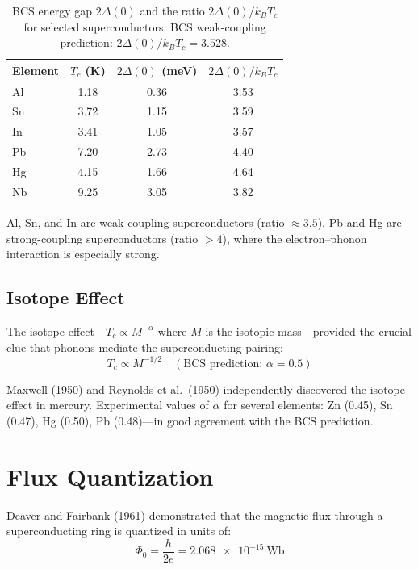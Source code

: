 \begin{table}[H]
\centering
\caption{BCS energy gap $2\Delta(0)$ and the ratio $2\Delta(0)/k_BT_c$ for selected superconductors. BCS weak-coupling prediction: $2\Delta(0)/k_BT_c = 3.528$.}
\label{tab:bcs_gap}
\begin{tabular}{@{}lSSS@{}}
\toprule
Element & {$T_c$ (\si{\kelvin})} & {$2\Delta(0)$ (\si{\milli\electronvolt})} & {$2\Delta(0)/k_BT_c$} \\
\midrule
Al & 1.18 & 0.36  & 3.53 \\
Sn & 3.72 & 1.15  & 3.59 \\
In & 3.41 & 1.05  & 3.57 \\
Pb & 7.20 & 2.73  & 4.40 \\
Hg & 4.15 & 1.66  & 4.64 \\
Nb & 9.25 & 3.05  & 3.82 \\
\bottomrule
\end{tabular}
\end{table}

Al, Sn, and In are weak-coupling superconductors (ratio $\approx 3.5$). Pb and Hg are strong-coupling superconductors (ratio $> 4$), where the electron--phonon interaction is especially strong.

\subsection{Isotope Effect}

The isotope effect---$T_c \propto M^{-\alpha}$ where $M$ is the isotopic mass---provided the crucial clue that phonons mediate the superconducting pairing:
\begin{equation}
  T_c \propto M^{-1/2} \quad (\text{BCS prediction: } \alpha = 0.5)
\end{equation}

Maxwell (1950) and Reynolds et al.\ (1950) independently discovered the isotope effect in mercury. Experimental values of $\alpha$ for several elements: Zn (0.45), Sn (0.47), Hg (0.50), Pb (0.48)---in good agreement with the BCS prediction.


\section{Flux Quantization}

Deaver and Fairbank (1961) demonstrated that the magnetic flux through a superconducting ring is quantized in units of:
\begin{equation}
  \Phi_0 = \frac{h}{2e} = \SI{2.068e-15}{\weber}
\end{equation}

